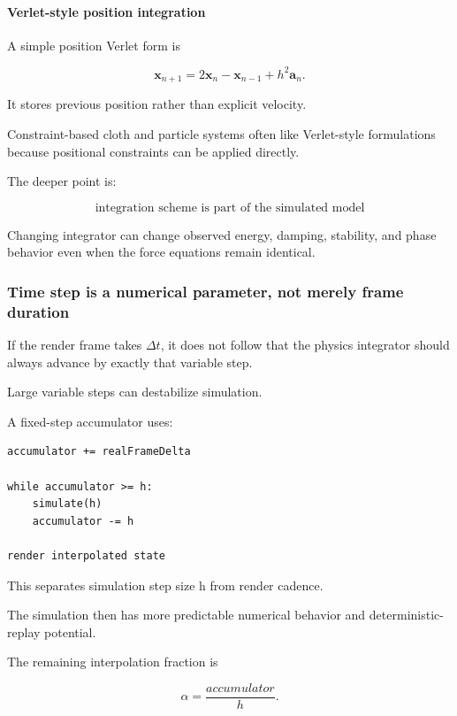 \paragraph{Verlet-style position integration}\label{03-visual-computing-i-ch001-verlet-style-position-integration}

A simple position Verlet form is

\[
\mathbf x_{n+1}
=
2\mathbf x_n
-
\mathbf x_{n-1}
+
h^2\mathbf a_n.
\]

It stores previous position rather than explicit velocity.

Constraint-based cloth and particle systems often like Verlet-style formulations because positional constraints can be applied directly.

The deeper point is:

\[
\boxed{
\text{integration scheme is part of the simulated model}
}
\]

Changing integrator can change observed energy, damping, stability, and phase behavior even when the force equations remain identical.

\subsubsection{Time step is a numerical parameter, not merely frame duration}\label{03-visual-computing-i-ch001-time-step-is-a-numerical-parameter-not-merely-frame-duration}

If the render frame takes \(\Delta t\), it does not follow that the physics integrator should always advance by exactly that variable step.

Large variable steps can destabilize simulation.

A fixed-step accumulator uses:

\begin{verbatim}
accumulator += realFrameDelta

while accumulator >= h:
    simulate(h)
    accumulator -= h

render interpolated state
\end{verbatim}

This separates simulation step size h from render cadence.

The simulation then has more predictable numerical behavior and deterministic-replay potential.

The remaining interpolation fraction is

\[
\alpha=
\frac{accumulator}{h}.
\]

